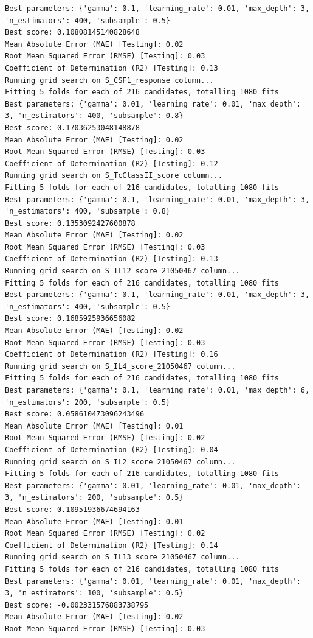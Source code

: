 \documentclass[
  letterpaper,
  DIV=11,
  numbers=noendperiod]{scrartcl}
\begin{document}
\begin{verbatim}
Best parameters: {'gamma': 0.1, 'learning_rate': 0.01, 'max_depth': 3, 'n_estimators': 400, 'subsample': 0.5}
Best score: 0.10808145140828648
Mean Absolute Error (MAE) [Testing]: 0.02
Root Mean Squared Error (RMSE) [Testing]: 0.03
Coefficient of Determination (R2) [Testing]: 0.13
Running grid search on S_CSF1_response column...
Fitting 5 folds for each of 216 candidates, totalling 1080 fits
Best parameters: {'gamma': 0.01, 'learning_rate': 0.01, 'max_depth': 3, 'n_estimators': 400, 'subsample': 0.8}
Best score: 0.17036253048148878
Mean Absolute Error (MAE) [Testing]: 0.02
Root Mean Squared Error (RMSE) [Testing]: 0.03
Coefficient of Determination (R2) [Testing]: 0.12
Running grid search on S_TcClassII_score column...
Fitting 5 folds for each of 216 candidates, totalling 1080 fits
Best parameters: {'gamma': 0.1, 'learning_rate': 0.01, 'max_depth': 3, 'n_estimators': 400, 'subsample': 0.8}
Best score: 0.1353092427600878
Mean Absolute Error (MAE) [Testing]: 0.02
Root Mean Squared Error (RMSE) [Testing]: 0.03
Coefficient of Determination (R2) [Testing]: 0.13
Running grid search on S_IL12_score_21050467 column...
Fitting 5 folds for each of 216 candidates, totalling 1080 fits
Best parameters: {'gamma': 0.1, 'learning_rate': 0.01, 'max_depth': 3, 'n_estimators': 400, 'subsample': 0.5}
Best score: 0.1685925936656082
Mean Absolute Error (MAE) [Testing]: 0.02
Root Mean Squared Error (RMSE) [Testing]: 0.03
Coefficient of Determination (R2) [Testing]: 0.16
Running grid search on S_IL4_score_21050467 column...
Fitting 5 folds for each of 216 candidates, totalling 1080 fits
Best parameters: {'gamma': 0.1, 'learning_rate': 0.01, 'max_depth': 6, 'n_estimators': 200, 'subsample': 0.5}
Best score: 0.058610473096243496
Mean Absolute Error (MAE) [Testing]: 0.01
Root Mean Squared Error (RMSE) [Testing]: 0.02
Coefficient of Determination (R2) [Testing]: 0.04
Running grid search on S_IL2_score_21050467 column...
Fitting 5 folds for each of 216 candidates, totalling 1080 fits
Best parameters: {'gamma': 0.01, 'learning_rate': 0.01, 'max_depth': 3, 'n_estimators': 200, 'subsample': 0.5}
Best score: 0.10951936674694163
Mean Absolute Error (MAE) [Testing]: 0.01
Root Mean Squared Error (RMSE) [Testing]: 0.02
Coefficient of Determination (R2) [Testing]: 0.14
Running grid search on S_IL13_score_21050467 column...
Fitting 5 folds for each of 216 candidates, totalling 1080 fits
Best parameters: {'gamma': 0.01, 'learning_rate': 0.01, 'max_depth': 3, 'n_estimators': 100, 'subsample': 0.5}
Best score: -0.002331576883738795
Mean Absolute Error (MAE) [Testing]: 0.02
Root Mean Squared Error (RMSE) [Testing]: 0.03

\end{verbatim}
\end{document}
